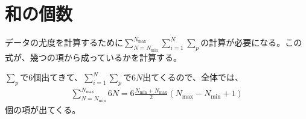 \documentclass{jsarticle}
\newcommand{\numput}{N}
\newcommand{\putmin}{N_{\mathrm{min}}}
\newcommand{\putmax}{N_{\mathrm{max}}}
\begin{document}
\section{和の個数}
データの尤度を計算するために$\displaystyle \sum_{\numput=\putmin}^{\putmax}\sum_{i=1}^{N} \sum_{p} $の計算が必要になる。この式が、幾つの項から成っているかを計算する。

$\sum_{p}$で6個出てきて、$\sum_{i=1}^{\numput} \sum_{p}$で$6\numput$出てくるので、全体では、
\begin{eqnarray*}
 \sum_{\numput=\putmin}^{\putmax} 6\numput = 6 \frac{\putmin + \putmax}{2}(\putmax - \putmin + 1)
\end{eqnarray*}
個の項が出てくる。
\end{document}
